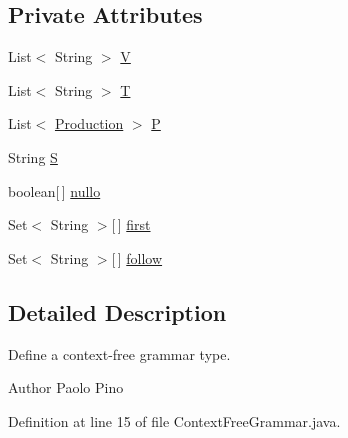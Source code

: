 \subsection*{Private Attributes}
\begin{DoxyCompactItemize}
\item 
List$<$ String $>$ \hyperlink{classcontext_free_1_1grammar_1_1_context_free_grammar_a8cecf8ee3fe6ca01f58aacf390720746}{V}
\item 
List$<$ String $>$ \hyperlink{classcontext_free_1_1grammar_1_1_context_free_grammar_a5e6072d2c2f11703160c3c39c2968489}{T}
\item 
List$<$ \hyperlink{classcontext_free_1_1grammar_1_1_production}{Production} $>$ \hyperlink{classcontext_free_1_1grammar_1_1_context_free_grammar_ae1f4363ca57c34622cdca5175aef6b6c}{P}
\item 
String \hyperlink{classcontext_free_1_1grammar_1_1_context_free_grammar_a516b9fb1183524ea3e7859b41f60ad32}{S}
\item 
boolean\mbox{[}$\,$\mbox{]} \hyperlink{classcontext_free_1_1grammar_1_1_context_free_grammar_a5a9f69817c82b19b21adb85326d60f3b}{nullo}
\item 
Set$<$ String $>$\mbox{[}$\,$\mbox{]} \hyperlink{classcontext_free_1_1grammar_1_1_context_free_grammar_a670c2e35761e57add4c2f3ae29131325}{first}
\item 
Set$<$ String $>$\mbox{[}$\,$\mbox{]} \hyperlink{classcontext_free_1_1grammar_1_1_context_free_grammar_a56137caac336fd26652d4c21252fd95f}{follow}
\end{DoxyCompactItemize}


\subsection{Detailed Description}
Define a context-\/free grammar type. 

\begin{DoxyAuthor}{Author}
Paolo Pino 
\end{DoxyAuthor}


Definition at line 15 of file Context\-Free\-Grammar.\-java.



